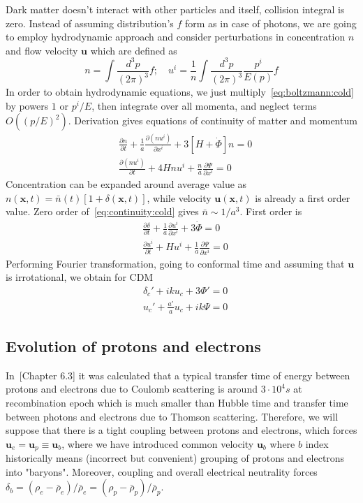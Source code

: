 \documentclass[12pt]{extarticle}
\numberwithin{problem}{section}
\numberwithin{theorem}{section}
\begin{document}
	Dark matter doesn't interact with other particles and itself, collision integral is zero. Instead of assuming distribution's $f$ form as in case of photons, we are going to employ hydrodynamic approach and consider perturbations in concentration $n$ and flow velocity $\mathbf{u}$ which are defined as
	\begin{equation}
		n = \int\frac{d^3p}{(2\pi)^3} f;\quad u^i = \frac{1}{n}\int\frac{d^3p}{(2\pi)^3} \frac{p^i}{E(p)}f
	\end{equation}
	In order to obtain hydrodynamic equations, we just multiply~\ref{eq:boltzmann:cold} by powers $1$ or $p^i/E$, then integrate over all momenta, and neglect terms $O((p/E)^2)$. Derivation gives equations of continuity of matter and momentum
	\begin{align}
		\label{eq:continuity:cold}
		& \frac{\partial n}{\partial t} + \frac{1}{a}\frac{\partial (nu^i)}{\partial x^i} + 3[H + \dot{\Phi}]n = 0\\
		\label{eq:momentum:cold}
		& \frac{\partial(nu^i)}{\partial t} + 4Hnu^i + \frac{n}{a}\frac{\partial \Psi}{\partial x^i} = 0
	\end{align}
	Concentration can be expanded around average value as $n(\mathbf{x}, t) = \bar{n}(t)[1 + \delta(\mathbf{x}, t)]$, while velocity $\mathbf{u}(\mathbf{x}, t)$ is already a first order value. Zero order of~\ref{eq:continuity:cold} gives $\bar{n}\sim 1/a^3$. First order is
	\begin{align}
		& \frac{\partial\delta}{\partial t} + \frac{1}{a}\frac{\partial u^i}{\partial x^i} + 3\dot{\Phi} = 0 \\
		& \frac{\partial u^i}{\partial t} + Hu^i + \frac{1}{a}\frac{\partial\Psi}{\partial x^i} = 0
	\end{align}
	Performing Fourier transformation, going to conformal time and assuming that $\mathbf{u}$ is irrotational, we obtain for CDM
	\begin{align}
		\label{eq:density:cold}
		& \delta_c' + iku_c + 3\Phi' = 0\\
		& u_c' + \frac{a'}{a}u_c + ik\Psi = 0
	\end{align}

	\subsection{Evolution of protons and electrons}
	In~\cite{gorbunov-rubakov-1:2017}[Chapter 6.3] it was calculated that a typical transfer time of energy between protons and electrons due to Coulomb scattering is around $3\cdot 10^4s$ at recombination epoch which is much smaller than Hubble time and transfer time between photons and electrons due to Thomson scattering. Therefore, we will suppose that there is a tight coupling between protons and electrons, which forces $\mathbf{u}_e = \mathbf{u}_p \equiv \mathbf{u}_b$, where we have introduced common velocity $\mathbf{u}_b$ where $b$ index historically means (incorrect but convenient) grouping of protons and electrons into "baryons". Moreover, coupling and overall electrical neutrality forces $\delta_b = (\rho_e - \bar{\rho}_e) / \bar{\rho}_e = (\rho_p - \bar{\rho}_p) / \bar{\rho}_p$.
	
\end{document}
